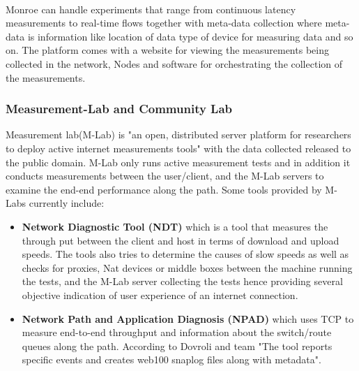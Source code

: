 \paragraph{}
Monroe can handle experiments that range from continuous latency measurements to real-time flows together with meta-data collection where meta-data is information like location of data type of device for measuring data and so on\cite{7523537}.
The platform comes with a website for viewing the measurements being collected in the network, Nodes and software for orchestrating the collection of the measurements\cite{7523537}.
\subsubsection{Measurement-Lab and Community Lab}
Measurement lab(M-Lab) is "an open, distributed server platform for researchers to deploy active internet measurements tools" with the data collected released to the public domain\cite{Dovrolis:2010:MLO:1823844.1823853,Braem:2015:AEQ:2830629.2830639}.
M-Lab only runs active measurement tests and in addition it conducts measurements between the user/client, and the M-Lab servers to examine the end-end performance along the path\cite{Dovrolis:2010:MLO:1823844.1823853}.
Some tools provided by M-Labs currently include:
\begin{itemize}
    \item \textbf{Network Diagnostic Tool (NDT)} which is a tool that measures the through put between the client and host in terms of download and upload speeds\cite{Dovrolis:2010:MLO:1823844.1823853,Braem:2015:AEQ:2830629.2830639}.
    The tools also tries to determine the causes of slow speeds as well as checks for proxies, Nat devices or middle boxes between the machine running the tests, and the M-Lab server collecting the tests hence providing several objective indication of user experience of an internet connection\cite{Braem:2015:AEQ:2830629.2830639}.
    \item \textbf{Network Path and Application Diagnosis (NPAD)} which uses TCP to measure end-to-end throughput and information about the switch/route queues along the path\cite{Dovrolis:2010:MLO:1823844.1823853}.
    According to Dovroli and team "The tool reports specific events and creates web100 snaplog files along with metadata"\cite{Dovrolis:2010:MLO:1823844.1823853}.
\end{itemize}
